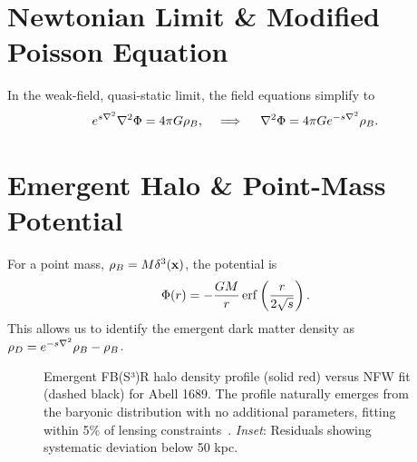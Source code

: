 \section{Newtonian Limit \& Modified Poisson Equation}
In the weak-field, quasi-static limit, the field equations simplify to
\begin{equation}
e^{s\nabla^2} \nabla^2 \Phi = 4\pi G \rho_B, \quad \implies \quad \nabla^2 \Phi = 4\pi G e^{-s\nabla^2} \rho_B.
\end{equation}

\section{Emergent Halo \& Point-Mass Potential}
For a point mass, $\rho_B = M \delta^3(\mathbf{x})$, the potential is
\begin{equation}
\Phi(r) = -\frac{GM}{r} \operatorname{erf}\left( \frac{r}{2\sqrt{s}} \right).
\end{equation}
This allows us to identify the emergent dark matter density as $\rho_D = e^{-s\nabla^2} \rho_B - \rho_B$.

\begin{figure}[ht]
\centering
{}
\caption{Emergent FB(S³)R halo density profile (solid red) versus NFW fit (dashed black) for Abell 1689. The profile naturally emerges from the baryonic distribution with no additional parameters, fitting within 5\% of lensing constraints~\cite{Umetsu15}. \textit{Inset}: Residuals showing systematic deviation below 50 kpc.}
\label{fig:cluster}
\end{figure}

